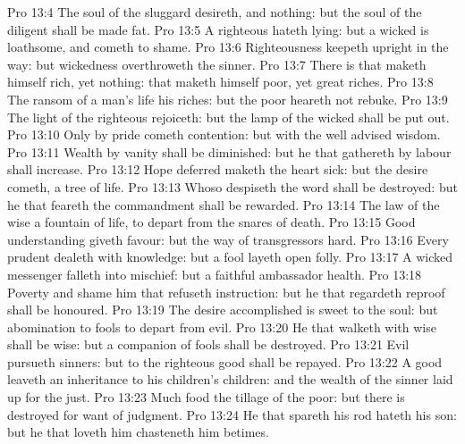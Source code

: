 \vs Pro 13:4 The soul of the sluggard desireth, and  nothing: but the soul of the diligent shall be made fat.
\vs Pro 13:5 A righteous  hateth lying: but a wicked  is loathsome, and cometh to shame.
\vs Pro 13:6 Righteousness keepeth  upright in the way: but wickedness overthroweth the sinner.
\vs Pro 13:7 There is that maketh himself rich, yet  nothing:  that maketh himself poor, yet  great riches.
\vs Pro 13:8 The ransom of a man's life  his riches: but the poor heareth not rebuke.
\vs Pro 13:9 The light of the righteous rejoiceth: but the lamp of the wicked shall be put out.
\vs Pro 13:10 Only by pride cometh contention: but with the well advised  wisdom.
\vs Pro 13:11 Wealth  by vanity shall be diminished: but he that gathereth by labour shall increase.
\vs Pro 13:12 Hope deferred maketh the heart sick: but  the desire cometh,  a tree of life.
\vs Pro 13:13 Whoso despiseth the word shall be destroyed: but he that feareth the commandment shall be rewarded.
\vs Pro 13:14 The law of the wise  a fountain of life, to depart from the snares of death.
\vs Pro 13:15 Good understanding giveth favour: but the way of transgressors  hard.
\vs Pro 13:16 Every prudent  dealeth with knowledge: but a fool layeth open  folly.
\vs Pro 13:17 A wicked messenger falleth into mischief: but a faithful ambassador  health.
\vs Pro 13:18 Poverty and shame  him that refuseth instruction: but he that regardeth reproof shall be honoured.
\vs Pro 13:19 The desire accomplished is sweet to the soul: but  abomination to fools to depart from evil.
\vs Pro 13:20 He that walketh with wise  shall be wise: but a companion of fools shall be destroyed.
\vs Pro 13:21 Evil pursueth sinners: but to the righteous good shall be repayed.
\vs Pro 13:22 A good  leaveth an inheritance to his children's children: and the wealth of the sinner  laid up for the just.
\vs Pro 13:23 Much food  the tillage of the poor: but there is  destroyed for want of judgment.
\vs Pro 13:24 He that spareth his rod hateth his son: but he that loveth him chasteneth him betimes.
